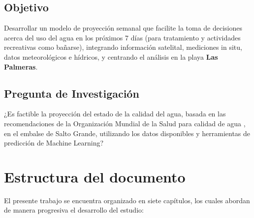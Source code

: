 \documentclass[11pt]{report}
\begin{document}
\subsection{Objetivo}
Desarrollar un modelo de proyección semanal que facilite la toma de decisiones acerca del uso del agua en los próximos 7 días (para tratamiento y actividades recreativas como bañarse), integrando información satelital, mediciones in situ, datos meteorológicos e hídricos, y centrando el análisis en la playa \textbf{Las Palmeras}.

\subsection{Pregunta de Investigación}

¿Es factible la proyección del estado de la calidad del agua, basada en las recomendaciones de la Organización Mundial de la Salud para calidad de agua \citep{WHO2021}, en el embalse de Salto Grande, utilizando los datos disponibles y herramientas de predicción de Machine Learning?

\section{Estructura del documento}

El presente trabajo se encuentra organizado en siete capítulos, los cuales abordan de manera progresiva el desarrollo del estudio:
\end{document}
